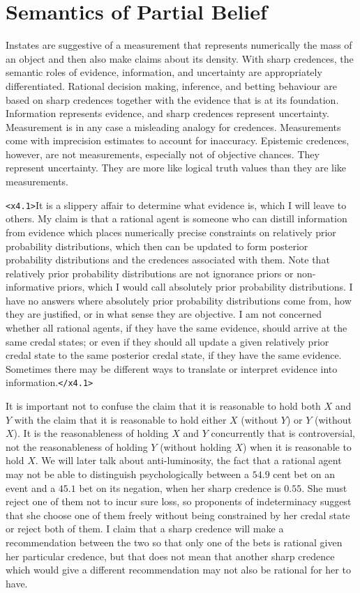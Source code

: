 \documentclass[11pt]{article}
\begin{document}
\section{Semantics of Partial Belief}
\label{SemanticsOfPartialBelief}

Instates are suggestive of a measurement that represents numerically
the mass of an object and then also make claims about its density.
With sharp credences, the semantic roles of evidence, information, and
uncertainty are appropriately differentiated. Rational decision
making, inference, and betting behaviour are based on sharp credences
together with the evidence that is at its foundation. Information
represents evidence, and sharp credences represent uncertainty.
Measurement is in any case a misleading analogy for credences.
Measurements come with imprecision estimates to account for
inaccuracy. Epistemic credences, however, are not measurements,
especially not of objective chances. They represent uncertainty. They
are more like logical truth values than they are like measurements.

\texttt{<x4.1>}It is a slippery affair to determine what evidence is,
which I will leave to others. My claim is that a rational agent is
someone who can distill information from evidence which places
numerically precise constraints on relatively prior probability
distributions, which then can be updated to form posterior probability
distributions and the credences associated with them. Note that
relatively prior probability distributions are not ignorance priors or
non-informative priors, which I would call absolutely prior
probability distributions. I have no answers where absolutely prior
probability distributions come from, how they are justified, or in
what sense they are objective. I am not concerned whether all rational
agents, if they have the same evidence, should arrive at the same
credal states; or even if they should all update a given relatively
prior credal state to the same posterior credal state, if they have
the same evidence. Sometimes there may be different ways to translate
or interpret evidence into information.\texttt{</x4.1>}

It is important not to confuse the claim that it is reasonable to hold
both $X$ and $Y$ with the claim that it is reasonable to hold either
$X$ (without $Y$) or $Y$ (without $X$). It is the reasonableness of
holding $X$ and $Y$ concurrently that is controversial, not the
reasonableness of holding $Y$ (without holding $X$) when it is
reasonable to hold $X$. We will later talk about anti-luminosity, the
fact that a rational agent may not be able to distinguish
psychologically between a $54.9$ cent bet on an event and a $45.1$ bet
on its negation, when her sharp credence is $0.55$. She must reject
one of them not to incur sure loss, so proponents of indeterminacy
suggest that she choose one of them freely without being constrained
by her credal state or reject both of them. I claim that a sharp
credence will make a recommendation between the two so that only one
of the bets is rational given her particular credence, but that does
not mean that another sharp credence which would give a different
recommendation may not also be rational for her to have.
\end{document}

